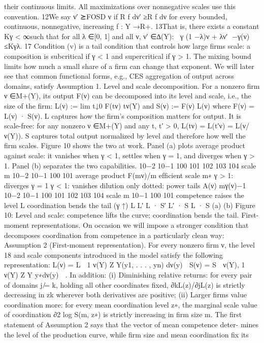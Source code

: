 their continuous limits. All maximizations over nonnegative scales use this convention.
12We say ν′ ⪰FOSD ν if R
f dν′ ≥R
f dν for every bounded, continuous, nonnegative, increasing
f : Y →R+.
13That is, there exists a constant Kγ < ∞such that for all λ ∈[0, 1] and all ν, ν′ ∈∆(Y):
γ
 (1 −λ)ν + λν′ −γ(ν)
 ≤Kγλ.
17
Condition (v) is a tail condition that controls how large firms scale: a composition is
subcritical if γ < 1 and supercritical if γ > 1. The mixing bound limits how much a small
share of a firm can change that exponent. We will later see that common functional
forms, e.g., CES aggregation of output across domains, satisfy Assumption 1.
Level and scale decomposition. For a nonzero firm ν ∈M+(Y), its output F(ν) can
be decomposed into its level and scale, i.e., the size of the firm:
L(ν) := lim
t↓0
F(tν)
tν(Y)
and
S(ν) := F(ν)
L(ν)
where F(ν) = L(ν) · S(ν). L captures how the firm’s composition matters for output.
It is scale-free: for any nonzero ν ∈M+(Y) and any t, t′ > 0, L(tν) = L(t′ν) =
L(ν/ν(Y)). S captures total output normalized by level and therefore how well the
firm scales. Figure 10 shows the two at work. Panel (a) plots average product against
scale: it vanishes when γ < 1, settles when γ = 1, and diverges when γ > 1. Panel (b)
separates the two capabilities.
10−2
10−1
100
101
102
103
104
scale m
10−2
10−1
100
101
average product F(mν)/m
efﬁcient scale m∗
γ > 1: diverges
γ = 1
γ < 1: vanishes
dilution only
dotted: power tails A(ν) mγ(ν)−1
10−2
10−1
100
101
102
103
104
scale m
10−1
100
101
competence raises
the level L
coordination bends
the tail (γ ↑)
L
L′
L · S′
L′ · S
L · S
(a)
(b)
Figure 10: Level and scale: competence lifts the curve; coordination bends the tail.
First-moment representations. On occasion we will impose a stronger condition that
decomposes coordination from competence in a particularly clean way:
Assumption 2 (First-moment representation). For every nonzero firm ν, the level
18
and scale components introduced in the model satisfy the following representation:
L(ν) = L

1
ν(Y)
Z
Y(y1, . . . , yn) dν(y)

S(ν) = S

ν(Y),
1
ν(Y)
Z
Y y∗dν(y)

.
In addition:
(i) Diminishing relative returns: for every pair of domains j ̸= k, holding all
other coordinates fixed, ∂kL(z)/∂jL(z) is strictly decreasing in zk wherever
both derivatives are positive;
(ii) Larger firms value coordination more: for every mean coordination level z∗,
the marginal scale value of coordination ∂2 log S(m, z∗) is strictly increasing
in firm size m.
The first statement of Assumption 2 says that the vector of mean competence deter-
mines the level of the production curve, while firm size and mean coordination fix its
